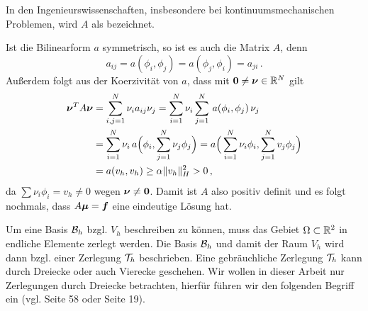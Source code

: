 In den Ingenieurswissenschaften, insbesondere bei kontinuumsmechanischen Problemen, wird $A$ als \textit{} bezeichnet.

\begin{bem}\label{bem:2.18}
Ist die Bilinearform $a$ symmetrisch, so ist es auch die Matrix $A$, denn
\[
	a_{ij} = a(\phi_i,\phi_j) = a(\phi_j,\phi_i)= a_{ji} \, .
\]
Außerdem folgt aus der Koerzivität von $a$, dass  mit $\boldsymbol 0 \not = \boldsymbol \nu \in \mathbb{R}^N$ gilt
\begin{align*}
	\boldsymbol \nu^T A \boldsymbol \nu & = \sum_{i,j=1}^N \nu_i a_{ij} \nu_j  =  \sum_{i=1}^N \nu_i\sum_{j=1}^N \, a(\phi_i,\phi_j) \, \nu_j   \\
	& = \sum_{i=1}^N \nu_i \, a\Big(\phi_i,\sum_{j=1}^N\nu_j\phi_j\Big) =  a\Big(\sum_{i=1}^N \nu_i\phi_i,\sum_{j=1}^Nv_j\phi_j\Big) \\
	& = a(v_h,v_h) \ge \alpha \lVert v_h\rVert^2_H > 0 \, ,
\end{align*}
da $\sum \nu_i \phi_i = v_h \not = 0$ wegen $\boldsymbol \nu \not = \boldsymbol 0$. Damit ist $A$ also positiv definit und es folgt nochmals, dass $A \boldsymbol \mu = \boldsymbol f$ eine eindeutige Lösung hat.
\end{bem}


Um eine Basis $\mathcal B_h$ bzgl. $V_h$ beschreiben zu können, muss das Gebiet $\Omega\subset \mathbb{R}^2$ in endliche Elemente zerlegt werden. Die Basis $\mathcal B_h$ und damit der Raum $V_h$ wird dann bzgl. einer Zerlegung $\mathcal T_h$ beschrieben. Eine gebräuchliche Zerlegung $\mathcal T_h$ kann durch Dreiecke oder auch Vierecke geschehen. Wir wollen in dieser Arbeit nur Zerlegungen durch Dreiecke betrachten, hierfür führen wir den folgenden Begriff ein (vgl. \cite{BraeFEM} Seite 58 oder \cite{StarkePDE} Seite 19).


